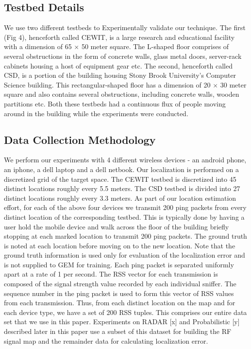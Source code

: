 \documentclass{Localization-PaperWriteupDraft}
\begin{document}
\subsection{Testbed Details}
\label{subsec:testbeddetails}

We use two different testbeds to Experimentally validate our technique. The first (Fig 4), henceforth called CEWIT, is a large research and educational facility with a dimension of 65 $\times$ 50  meter square. The L-shaped floor comprises of several obstructions in the form of concrete walls, glass metal doors, server-rack cabinets housing a host of equipment gear etc. The second, henceforth called CSD, is a portion of the building housing Stony Brook University's Computer Science building. This rectangular-shaped floor has a dimension of 20 $\times$ 30 meter square and also contains several obstructions, including concrete walls, wooden partitions etc. Both these testbeds had a continuous flux of people moving around in the building while the experiments were conducted.

\subsection{Data Collection Methodology}
\label{subsec:datacollectionmethodology}

We perform our experiments with 4 different wireless devices - an android phone, an iphone, a dell laptop and a dell netbook. Our localization is performed on a discretized grid of the target space. The CEWIT testbed is discretized into 45 distinct locations roughly every 5.5 meters. The CSD testbed is divided into 27 distinct locations roughly every 3.3 meters. As part of our location estimation effort,  for each of the above four devices we transmit 200 ping packets from every distinct location of the corresponding testbed. This is typically done by having a user hold the mobile device and walk across the floor of the building briefly stopping at each marked location to transmit 200 ping packets. The ground truth is noted at each location before moving on to the new location. Note that the ground truth information is used only for evaluation of the localization error and is not supplied to GEM for training. Each ping packet is separated uniformly apart at a rate of 1 per second. The RSS vector for each transmission is composed of the signal strength value recorded by each individual sniffer. The sequence number in the ping packet is used to form this vector of RSS values from each transmission. Thus, from each distinct location on the map and for each device type, we have a set of 200 RSS tuples. This comprises our entire data set that we use in this paper. Experiments on RADAR [x] and Probabilistic [y] described later in this paper use a subset of this dataset for building the RF signal map and the remainder data for calculating localization error.
\end{document}
